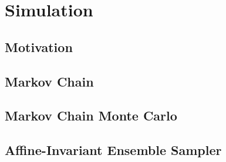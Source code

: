 \section{ Simulation}\label{sec:bc_mcmc}


\subsection{Motivation}\label{sub:bc_mcmc_motivation}





\subsection{Markov Chain}\label{sub:bc_mcmc_mc}




\subsection{Markov Chain Monte Carlo}\label{sub:bc_mcmc_mcmc}





\subsection{Affine-Invariant Ensemble Sampler}\label{sub:bc_mcmc_aies}






